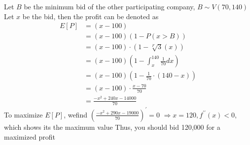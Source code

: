 Let $B$ be the minimum bid of the other participating company, $B \sim V(70,140)$ Let $x$ be the bid, then the profit can be denoted as
\[
\begin{aligned}
E[P] &=(x-100) \\
&=(x-100)(1-P(x>B)) \\
&=(x-100) \cdot(1-\sqrt[F]{3}(x)) \\
&=(x-100)\left(1-\int_{x}^{140} \frac{1}{70} d x\right) \\
&=(x-100)\left(1-\frac{1}{70} \cdot(140-x)\right) \\
&=(x-100) \cdot \frac{x-70}{70} \\
&=\frac{-x^{2}+240 x-14000}{70}
\end{aligned}
\]
To maximize $E[P]$, wefind $\left(\frac{-x^{2}+290 x-19000}{70}\right)^{\prime}=0$
$\Rightarrow x=120, f^{\prime \prime}(x)<0$, which shows its the maximum value
Thus, you should bid 120,000 for a maximized profit